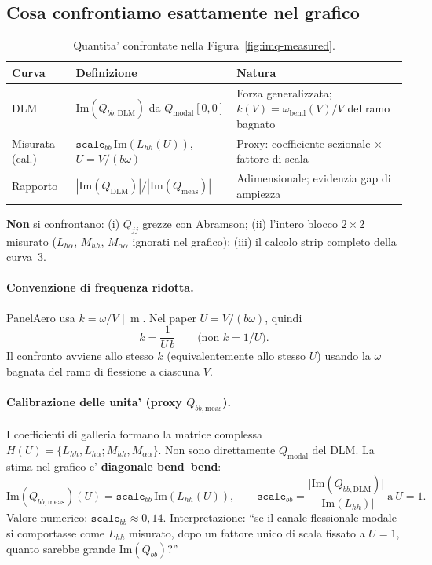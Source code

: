 \documentclass[11pt,a4paper]{article}
\begin{document}
\subsection{Cosa confrontiamo esattamente nel grafico}

\begin{table}[H]
  \centering
  \caption{Quantita' confrontate nella Figura~\ref{fig:imq-measured}.}
  \label{tab:imq-compare}
  \begin{tabular}{p{2.2cm}p{5.2cm}p{5.5cm}}
    \toprule
    Curva & Definizione & Natura \\
    \midrule
    DLM &
    $\mathrm{Im}(Q_{bb,\mathrm{DLM}})$ da $Q_\mathrm{modal}[0,0]$ &
    Forza generalizzata; $k(V)=\omega_\mathrm{bend}(V)/V$ del ramo bagnato \\
    Misurata (cal.) &
    $\texttt{scale}_{bb}\,\mathrm{Im}(L_{hh}(U))$, $U=V/(b\omega)$ &
    Proxy: coefficiente sezionale $\times$ fattore di scala \\
    Rapporto &
    $|\mathrm{Im}(Q_\mathrm{DLM})|/|\mathrm{Im}(Q_\mathrm{meas})|$ &
    Adimensionale; evidenzia gap di ampiezza \\
    \bottomrule
  \end{tabular}
\end{table}

\textbf{Non} si confrontano: (i) $Q_{jj}$ grezze con Abramson; (ii) l'intero blocco
$2\times2$ misurato ($L_{h\alpha}$, $M_{hh}$, $M_{\alpha\alpha}$ ignorati nel grafico);
(iii) il calcolo strip completo della curva~3.

\paragraph{Convenzione di frequenza ridotta.}
PanelAero usa $k=\omega/V$ [\si{\per\meter}]. Nel paper $U=V/(b\omega)$, quindi
\begin{equation}
  k = \frac{1}{U\,b}
  \qquad\text{(non }k=1/U\text{).}
\end{equation}
Il confronto avviene allo stesso $k$ (equivalentemente allo stesso $U$) usando la
$\omega$ bagnata del ramo di flessione a ciascuna $V$.

\paragraph{Calibrazione delle unita' (proxy $Q_{bb,\mathrm{meas}}$).}
I coefficienti di galleria formano la matrice complessa
$H(U)=\{L_{hh},L_{h\alpha};M_{hh},M_{\alpha\alpha}\}$.
Non sono direttamente $Q_\mathrm{modal}$ del DLM. La stima nel grafico e' \textbf{diagonale
bend--bend}:
\[
  \mathrm{Im}(Q_{bb,\mathrm{meas}})(U)
  = \texttt{scale}_{bb}\,\mathrm{Im}(L_{hh}(U)),
  \qquad
  \texttt{scale}_{bb}
  = \frac{\bigl|\mathrm{Im}(Q_{bb,\mathrm{DLM}})\bigr|}{\bigl|\mathrm{Im}(L_{hh})\bigr|}
  \ \text{a}\ U=1.
\]
Valore numerico: $\texttt{scale}_{bb}\approx 0{,}14$.
Interpretazione: ``se il canale flessionale modale si comportasse come $L_{hh}$ misurato,
dopo un fattore unico di scala fissato a $U=1$, quanto sarebbe grande $\mathrm{Im}(Q_{bb})$?''
\end{document}
